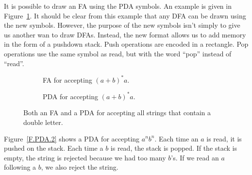 \documentclass[letterpaper,12pt,openany,reqno]{book}%
\newcommand{\fanonterminalnode}[2] {\node at (#1) (#2) [circle, draw, minimum size=24pt] {#2};}
\newcommand{\faarctransition}[5] {\draw [->] (#1) to[out=#4, in=#5] node  [midway, above] {#3} (#2) ;}
\newcommand{\faloopright}[2] {\draw (#1) edge [loop right] node {#2} ();}
\newcommand{\faloopleft}[2] {\path (#1) edge [loop left] node {#2} ();}
\newcommand{\pdaterminal}[3] {\node at (#1) (#2) [rectangle, draw, rounded corners] {#3};}
\newcommand{\pdaread}[3] {\node at (#1) (#2) [diamond, draw] {#3}; }
\newcommand{\pdatransition}[3] {\draw [->] (#1) -- (#2) node [midway, above] {#3};}
\newcommand{\pdaxthree}[4] {\draw [->] (#1) -- (#2) node [midway, above] {#4} -- (#3) ;}
\newcommand{\pdaxfour}[5] {\draw [->] (#1) -- (#2) node [midway, above] {#5} -- (#3) -- (#4);}
\newcommand{\pdarighttransition}[3] {\draw [->] (#1) -- (#2) node [midway, right] {#3};}
\begin{document}
It is possible to draw an FA using the PDA symbols. An example is given in Figure~\ref{F.PDA.1}. It should be clear from this example that any DFA can be drawn using the new symbols. However, the purpose of the new symbols isn't simply to give us another wan to draw DFAs. Instead, the new format allows us to add memory in the form of a pushdown stack. Push operations are encoded in a rectangle. Pop operations use the same symbol as read, but with the word ``pop'' instead of ``read''.
\begin{figure}[hbt]
\centering
\begin{subfigure}[b]{0.45\textwidth}
\centering
{}
 \caption{FA for accepting $(a+b)^*a$.}
\end{subfigure}

\begin{subfigure}[b]{0.45\textwidth}
\centering
{}
 \caption{PDA for accepting $(a+b)^*a$.}
\end{subfigure}

\caption{Both an FA and a PDA for accepting all strings that contain a double letter.}
\label{F.PDA.1}
\end{figure}

Figure~\ref{F.PDA.2} shows a PDA for accepting $a^nb^n$. Each time an $a$ is read, it is pushed on the stack. Each time a $b$ is read, the stack is popped. If the stack is empty, the string is rejected because we had too many $b$'s. If we read an $a$ following a $b$, we also reject the string.
\end{document}
